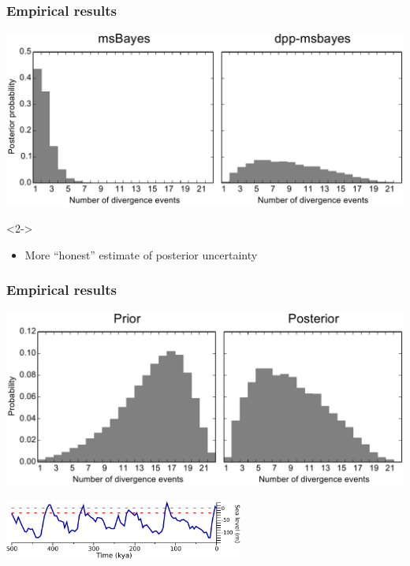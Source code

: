 \begin{frame}
    \frametitle{Empirical results}
    \centerline{
    \includegraphics[width=\textwidth]{../../empirical-analyses/plots/philippines-dpp-psi-posterior-old-vs-dpp.pdf}}

    \begin{uncoverenv}<2->
    \begin{itemize}
        \item More ``honest'' estimate of posterior uncertainty
    \end{itemize}
    \end{uncoverenv}
\end{frame}

\begin{frame}
    \frametitle{Empirical results}
    \centerline{
    \includegraphics[width=\textwidth]{../../empirical-analyses/plots/philippines-dpp-psi-posterior-prior.pdf}}
    \smallskip
    \centerline{
    \includegraphics[height=2cm]{../images/sea-level-only.pdf}}
\end{frame}

